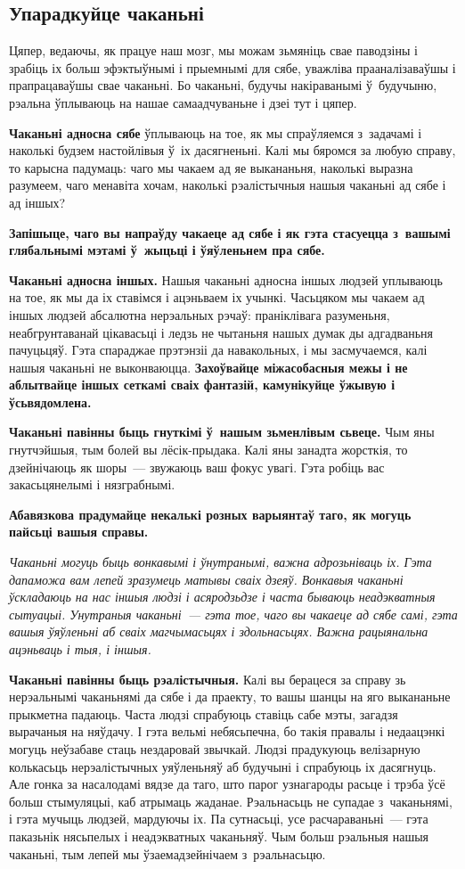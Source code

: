 \subsection*{Упарадкуйце чаканьні}

Цяпер, ведаючы, як працуе наш мозг, мы можам зьмяніць свае паводзіны і зрабіць іх больш эфэктыўнымі і прыемнымі для сябе, уважліва прааналізаваўшы і прапрацаваўшы свае чаканьні. Бо чаканьні, будучы накіраванымі ў~будучыню, рэальна ўплываюць на нашае самаадчуваньне і дзеі тут і цяпер.

\textbf{Чаканьні адносна сябе} ўплываюць на тое, як мы спраўляемся з~задачамі і наколькі будзем настойлівыя ў~іх дасягненьні. Калі мы бяромся за любую справу, то карысна падумаць: чаго мы чакаем ад яе выкананьня, наколькі выразна разумеем, чаго менавіта хочам, наколькі рэалістычныя нашыя чаканьні ад сябе і ад іншых?

\textbf{Запішыце, чаго вы напраўду чакаеце ад сябе і як гэта стасуецца з~вашымі глябальнымі мэтамі ў~жыцьці і ўяўленьнем пра сябе.}

\textbf{Чаканьні адносна іншых.} Нашыя чаканьні адносна іншых людзей уплываюць на тое, як мы да іх ставімся і ацэньваем іх учынкі. Часьцяком мы чакаем ад іншых людзей абсалютна нерэальных рэчаў: праніклівага разуменьня, неабгрунтаванай цікавасьці і ледзь не чытаньня нашых думак ды адгадваньня пачуцьцяў. Гэта спараджае прэтэнзіі да навакольных, і мы засмучаемся, калі нашыя чаканьні не выконваюцца. \textbf{Захоўвайце міжасобасныя межы і не аблытвайце іншых сеткамі сваіх фантазій, камунікуйце ўжывую і ўсьвядомлена.}

\textbf{Чаканьні павінны быць гнуткімі ў~нашым зьменлівым сьвеце.} Чым яны гнутчэйшыя, тым болей вы лёсік-прыдака. Калі яны занадта жорсткія, то дзейнічаюць як шоры~--- звужаюць ваш фокус увагі. Гэта робіць вас закасьцянелымі і нязграбнымі.

\textbf{Абавязкова прадумайце некалькі розных варыянтаў таго, як могуць пайсьці вашыя справы.}

\emph{Чаканьні могуць быць вонкавымі і ўнутранымі, важна адрозьніваць іх. Гэта дапаможа вам лепей зразумець матывы сваіх дзеяў. Вонкавыя чаканьні ўскладаюць на нас іншыя людзі і асяродзьдзе і часта бываюць неадэкватныя сытуацыі. Унутраныя чаканьні~--- гэта тое, чаго вы чакаеце ад сябе самі, гэта вашыя ўяўленьні аб сваіх магчымасьцях і здольнасьцях. Важна рацыянальна ацэньваць і тыя, і іншыя.}

\textbf{Чаканьні павінны быць рэалістычныя.} Калі вы берацеся за справу зь нерэальнымі чаканьнямі да сябе і да праекту, то вашы шанцы на яго выкананьне прыкметна падаюць. Часта людзі спрабуюць ставіць сабе мэты, загадзя вырачаныя на няўдачу. І гэта вельмі небясьпечна, бо такія правалы і недаацэнкі могуць неўзабаве стаць нездаровай звычкай. Людзі прадукуюць велізарную колькасьць нерэалістычных уяўленьняў аб будучыні і спрабуюць іх дасягнуць. Але гонка за насалодамі вядзе да таго, што парог узнагароды расьце і трэба ўсё больш стымуляцыі, каб атрымаць жаданае. Рэальнасьць не супадае з~чаканьнямі, і гэта мучыць людзей, мардуючы іх. Па сутнасьці, усе расчараваньні~--- гэта паказьнік нясьпелых і неадэкватных чаканьняў. Чым больш рэальныя нашыя чаканьні, тым лепей мы ўзаемадзейнічаем з~рэальнасьцю.

